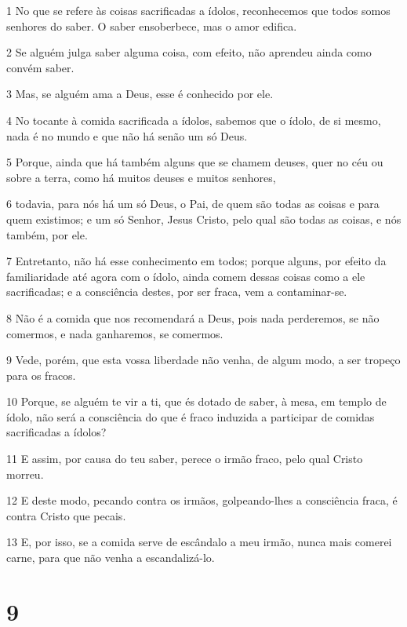 \par 1 No que se refere às coisas sacrificadas a ídolos, reconhecemos que todos somos senhores do saber. O saber ensoberbece, mas o amor edifica.
\par 2 Se alguém julga saber alguma coisa, com efeito, não aprendeu ainda como convém saber.
\par 3 Mas, se alguém ama a Deus, esse é conhecido por ele.
\par 4 No tocante à comida sacrificada a ídolos, sabemos que o ídolo, de si mesmo, nada é no mundo e que não há senão um só Deus.
\par 5 Porque, ainda que há também alguns que se chamem deuses, quer no céu ou sobre a terra, como há muitos deuses e muitos senhores,
\par 6 todavia, para nós há um só Deus, o Pai, de quem são todas as coisas e para quem existimos; e um só Senhor, Jesus Cristo, pelo qual são todas as coisas, e nós também, por ele.
\par 7 Entretanto, não há esse conhecimento em todos; porque alguns, por efeito da familiaridade até agora com o ídolo, ainda comem dessas coisas como a ele sacrificadas; e a consciência destes, por ser fraca, vem a contaminar-se.
\par 8 Não é a comida que nos recomendará a Deus, pois nada perderemos, se não comermos, e nada ganharemos, se comermos.
\par 9 Vede, porém, que esta vossa liberdade não venha, de algum modo, a ser tropeço para os fracos.
\par 10 Porque, se alguém te vir a ti, que és dotado de saber, à mesa, em templo de ídolo, não será a consciência do que é fraco induzida a participar de comidas sacrificadas a ídolos?
\par 11 E assim, por causa do teu saber, perece o irmão fraco, pelo qual Cristo morreu.
\par 12 E deste modo, pecando contra os irmãos, golpeando-lhes a consciência fraca, é contra Cristo que pecais.
\par 13 E, por isso, se a comida serve de escândalo a meu irmão, nunca mais comerei carne, para que não venha a escandalizá-lo.

\chapter{9}

